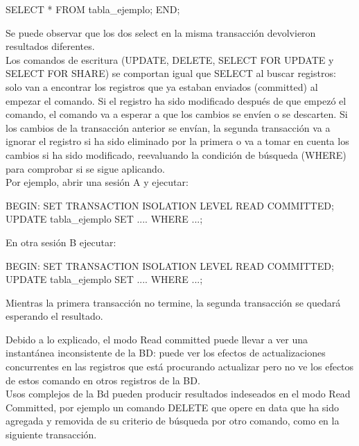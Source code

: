 \begin{pyglist}
SELECT * FROM tabla_ejemplo; 
END;
\end{pyglist}

Se puede observar que los dos select en la misma transacción devolvieron resultados diferentes.\\

Los comandos de escritura (UPDATE, DELETE, SELECT FOR UPDATE y SELECT FOR SHARE) se comportan igual que SELECT al buscar registros: solo van a encontrar los registros que ya estaban enviados (committed) al empezar el comando. Si el registro ha sido modificado después de que empezó el comando, el comando va a esperar a que los cambios se envíen o se descarten. Si los cambios de la transacción anterior se envían, la segunda transacción va a ignorar el registro si ha sido eliminado por la primera o va a tomar en cuenta los cambios si ha sido modificado, reevaluando la condición de búsqueda (WHERE) para comprobar si se sigue aplicando.\\

Por ejemplo, abrir una sesión A y ejecutar:\\

\begin{pyglist}
BEGIN:
SET TRANSACTION ISOLATION LEVEL READ COMMITTED;
UPDATE tabla_ejemplo SET .... WHERE ...;
\end{pyglist}

En otra sesión B ejecutar:\\

\begin{pyglist}
BEGIN:
SET TRANSACTION ISOLATION LEVEL READ COMMITTED;
UPDATE tabla_ejemplo SET .... WHERE ...;
\end{pyglist}

Mientras la primera transacción no termine, la segunda transacción se quedará esperando el resultado.

Debido a lo explicado, el modo Read committed puede llevar a ver una instantánea inconsistente de la BD: puede ver los efectos de actualizaciones concurrentes en las registros que está procurando actualizar pero no ve los efectos de estos comando en otros registros de la BD.\\

Usos complejos de la Bd pueden producir resultados indeseados en el modo Read Committed, por ejemplo un comando DELETE que opere en data que ha sido agregada y removida de su criterio de búsqueda por otro comando, como en la siguiente transacción.\\

